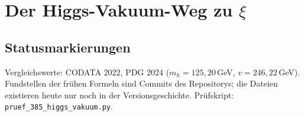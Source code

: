 
\providecommand{\BM}{\textbf{[B]}}
\providecommand{\KM}{\textbf{[K]}}
\providecommand{\SM}{\textbf{[S]}}
\providecommand{\XM}{\textbf{[X]}}
\providecommand{\QM}{\textbf{[Q]}}

\chapter*{Der Higgs-Vakuum-Weg zu \texorpdfstring{$\xi$}{xi}}

\begin{abstract}
Der erste Weg zu den Zusammenhängen der FFGFT führte über das Vakuum und das Higgs-Feld. Im
Frühjahr 2025 entstand daraus eine Formel, die die Higgs-Größen mit der elektrischen
Feldkonstante $\varepsilon_0$ verband:
$\lambda_h^2v^2e^2/(64\pi^4\varepsilon_0\hbar c\,m_h^2)$. Dieses Dokument verfolgt die Formel
anhand der Versionsgeschichte vom Februar 2025 bis heute, rechnet jede Stufe nach und stellt den
heutigen Stand fest. Ausgeschrieben ist die Vakuumformel genau $\xi_{\text{EFT}}\cdot\alpha$ mit
$\xi_{\text{EFT}}=\lambda_h^2v^2/(16\pi^3m_h^2)$; mit der FFGFT-Konvention $\alpha=1$ wird sie zum
heutigen Higgs-Weg. Mit der Selbstkopplung $\lambda_h=m_h^2/(2v^2)$ ergibt sich
$\xi_{\text{EFT}}=m_h^2/(64\pi^3v^2)=1{,}30\times10^{-4}$, rund $2{,}3\,\%$ unter $\xi=4/30000$.
Die Higgs-Geometrie ist damit eine Konsistenzprüfung von $\xi$ auf wenige Prozent \KM, keine
exakte Herleitung. Nicht tragfähig sind die frühe Gleichsetzung des Ausdrucks mit~1, eine kurzlebige
Variante mit $\mu_0/\varepsilon_0$ und die spätere Verkürzung auf $1/(16\pi^3)$ \XM. Der Faktor
$64\pi^4$ der frühen HTML-Fassungen stammt aus dem $4\pi$ in $4\pi\varepsilon_0$.
\end{abstract}

\section*{Statusmarkierungen}

Vergleichswerte: CODATA 2022, PDG 2024 ($m_h=125{,}20$\,GeV, $v=246{,}22$\,GeV). Fundstellen der
frühen Formeln sind Commits des Repositorys; die Dateien existieren heute nur noch in der
Versionsgeschichte. Prüfskript: \texttt{pruef\_385\_higgs\_vakuum.py}.

